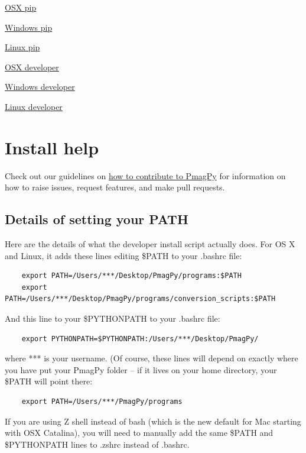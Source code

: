 \documentclass[11pt]{book}
\begin{document}
{\href{https://earthref.org/PmagPy/cookbook/osx_pip.html}{OSX pip}

\href{https://earthref.org/PmagPy/cookbook/windows_pip.html}{Windows pip}

\href{https://earthref.org/PmagPy/cookbook/linux_pip.html}{Linux pip}

\href{https://earthref.org/PmagPy/cookbook/osx_developer.html}{OSX developer}

\href{https://earthref.org/PmagPy/cookbook/windows_developer.html}{Windows developer}

\href{https://earthref.org/PmagPy/cookbook/linux_developer.html}{Linux developer}

\section{Install help}

Check out our guidelines on \href{https://github.com/PmagPy/PmagPy/blob/master/CONTRIBUTING.md}{how to contribute to PmagPy} for information on how to raise issues, request features, and make pull requests.


\subsection{Details of setting your PATH}
Here are the details of what the developer install script actually does.  For OS X and Linux, it adds these lines editing \$PATH to your .bashrc file:

\begin{verbatim}
    export PATH=/Users/***/Desktop/PmagPy/programs:$PATH
    export PATH=/Users/***/Desktop/PmagPy/programs/conversion_scripts:$PATH
\end{verbatim}

And this line to your \$PYTHONPATH to your .bashrc file:

\begin{verbatim}
    export PYTHONPATH=$PYTHONPATH:/Users/***/Desktop/PmagPy/
\end{verbatim}


where *** is your username.  (Of course, these lines will depend on exactly where you have put your PmagPy folder -- if it lives on your home directory, your \$PATH will point there:
\begin{verbatim}
    export PATH=/Users/***/PmagPy/programs
\end{verbatim}

If you are using Z shell instead of bash (which is the new default for Mac starting with OSX Catalina), you will need to manually add the same \$PATH and \$PYTHONPATH lines to .zshrc instead of .bashrc.

}
\end{document}
